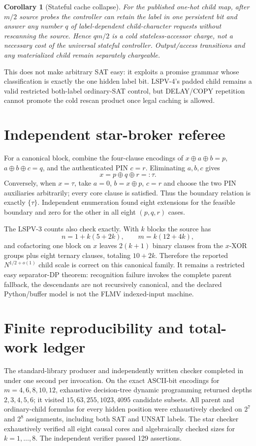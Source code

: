 \documentclass[11pt]{article}
\newtheorem{corollary}{Corollary}
\begin{document}
\begin{corollary}[Stateful cache collapse]
For the published one-hot child map, after $m/2$ source probes the controller
can retain the label in one persistent bit and answer any number $q$ of
label-dependent child-character requests without rescanning the source.
Hence $q m/2$ is a cold stateless-accessor charge, not a necessary cost of the
universal stateful controller.  Output/access transitions and any materialized
child remain separately chargeable.
\end{corollary}
This does not make arbitrary SAT easy: it exploits a promise grammar whose
classification is exactly the one hidden label bit.  LSPV-4's padded child
remains a valid restricted both-label ordinary-SAT control, but DELAY/COPY
repetition cannot promote the cold rescan product once legal caching is allowed.

\section{Independent star-broker referee}
For a canonical block, combine the four-clause encodings of
$x\oplus a\oplus b=p$, $a\oplus b\oplus c=q$, and the authenticated PIN
$c=r$.  Eliminating $a,b,c$ gives
\[
  x=p\oplus q\oplus r=:\tau.
\]
Conversely, when $x=\tau$, take $a=0$, $b=x\oplus p$, $c=r$ and choose the
two PIN auxiliaries arbitrarily; every core clause is satisfied.  Thus the
boundary relation is exactly $\{\tau\}$.  Independent enumeration found eight
extensions for the feasible boundary and zero for the other in all eight
$(p,q,r)$ cases.

The LSPV-3 counts also check exactly.  With $k$ blocks the source has
\[
 n=1+k(5+2k),\qquad m=k(12+4k),
\]
and cofactoring one block on $x$ leaves $2(k+1)$ binary clauses from the
$x$-XOR groups plus eight ternary clauses, totaling $10+2k$.  Therefore the
reported $N^{1/2+o(1)}$ child scale is correct on this canonical family.
It remains a restricted easy separator-DP theorem: recognition failure invokes
the complete parent fallback, the descendants are not recursively canonical,
and the declared Python/buffer model is not the FLMV indexed-input machine.

\section{Finite reproducibility and total-work ledger}
The standard-library producer and independently written checker completed in
under one second per invocation.  On the exact ASCII-bit encodings for
$m=4,6,8,10,12$, exhaustive decision-tree dynamic programming returned depths
$2,3,4,5,6$; it visited $15,63,255,1023,4095$ candidate subsets.  All parent
and ordinary-child formulas for every hidden position were exhaustively checked
on $2^7$ and $2^8$ assignments, including both SAT and UNSAT labels.  The star
checker exhaustively verified all eight causal cores and algebraically checked
sizes for $k=1,\ldots,8$.  The independent verifier passed 129 assertions.
\end{document}
